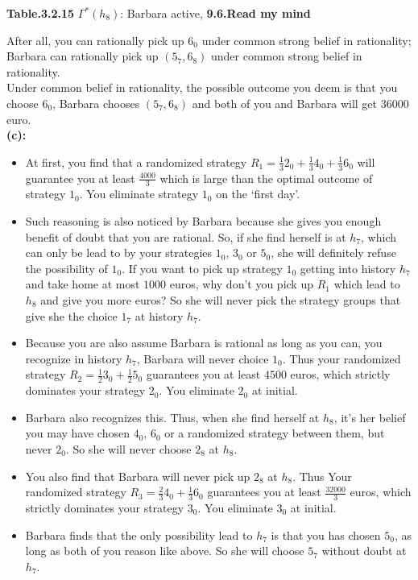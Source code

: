 \documentclass{article}
\begin{document}
\begin{description}
\begin{center}
        {\bf Table.3.2.15 }$\Gamma ^{*}(h_8)$: Barbara active, {\bf 9.6.Read my mind}
    \end{center}
    After all, you can rationally pick up $6_0$ under common strong belief in rationality; Barbara can rationally pick up $(5_7,6_8)$ under common strong belief in rationality.\\
    Under common belief in rationality, the possible outcome you deem is that you choose $6_0$, Barbara chooses $(5_7,6_8)$ and both of you and Barbara will get $36000$ euro.\\
    {\bf (c):}
    \begin{itemize}
      \item At first, you find that a randomized strategy $R_1=\frac{1}{3}2_0+\frac{1}{3}4_0+\frac{1}{3}6_0$ will guarantee you at least $\frac{4000}{3}$ which is large than the optimal outcome of strategy $1_0$. You eliminate strategy $1_0$ on the `first day'.
      \item Such reasoning is also noticed by Barbara because she gives you enough benefit of doubt that you are rational. So, if she find herself is at $h_7$, which can only be lead to by your strategies $1_0$, $3_0$ or $5_0$, she will definitely refuse the possibility of $1_0$. If you want to pick up strategy $1_0$ getting into history $h_7$ and take home at most $1000$ euros, why don't you pick up $R_1$ which lead to $h_8$ and give you more euros? So she will never pick the strategy groups that give she the choice $1_7$ at history $h_7$.
      \item Because you are also assume Barbara is rational as long as you can, you recognize in history $h_7$, Barbara will never choice $1_0$. Thus your randomized strategy $R_2=\frac{1}{2}3_0+\frac{1}{2}5_0$ guarantees you at least $4500$ euros, which strictly dominates your strategy $2_0$. You eliminate $2_0$ at initial.
      \item Barbara also recognizes this. Thus, when she find herself at $h_8$, it's her belief you may have chosen $4_0$, $6_0$ or a randomized strategy between them, but never $2_0$. So she will never choose $2_8$ at $h_8$.
      \item You also find that Barbara will never pick up $2_8$ at $h_8$. Thus Your randomized strategy $R_3=\frac{2}{3}4_0+\frac{1}{3}6_0$ guarantees you at least $\frac{32000}{3}$ euros, which strictly dominates your strategy $3_0$. You eliminate $3_0$ at initial.
      \item Barbara finds that the only possibility lead to $h_7$ is that you has chosen $5_0$, as long as both of you reason like above. So she will choose $5_7$ without doubt at $h_7$.

\end{itemize}
\end{description}
\end{document}

